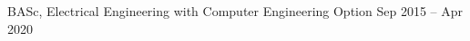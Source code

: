 \begin{cventries}
\begin{cventrymulti}
    \cvposition
      {
        BASc,
        Electrical Engineering with Computer Engineering
        Option
      } %
      {Sep 2015 -- Apr 2020} %
      {
      } %

  \end{cventrymulti}
  \vspace{-1.5em}

\end{cventries}
